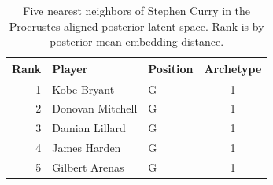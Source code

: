 \begin{table}[htbp]
  \centering\small
  \begin{tabular}{rllc}
    \toprule
    Rank & Player & Position & Archetype \\
    \midrule
    1 & Kobe Bryant & G & 1 \\
    2 & Donovan Mitchell & G & 1 \\
    3 & Damian Lillard & G & 1 \\
    4 & James Harden & G & 1 \\
    5 & Gilbert Arenas & G & 1 \\
    \bottomrule
  \end{tabular}
  \caption{Five nearest neighbors of Stephen Curry in the Procrustes-aligned posterior latent space. Rank is by posterior mean embedding distance.}
  \label{tab:Stephen_Curry_neighbors}
\end{table}

